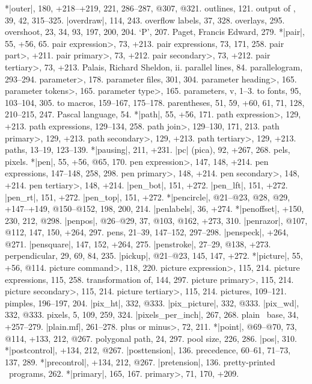 *|outer|, 180, +218--+219, 221, 286--287, @307, @321.
outlines, 121.
output of \MF, 39, 42, 315--325.
|overdraw|, 114, 243.
overflow labels, 37, 328.
overlays, 295.
overshoot, 23, 34, 93, 197, 200, 204.
\newletter
`P', 207.
Paget, Francis Edward, 279.
*|pair|, 55, +56, 65.
\<pair expression>, 73, +213.
pair expressions, 73, 171, 258.
\<pair part>, +211.
\<pair primary>, 73, +212.
\<pair secondary>, 73, +212.
\<pair tertiary>, 73, +213.
Palais, Richard Sheldon, ii.
parallel lines, 84.
parallelogram, 293--294.
\<parameter>, 178.
parameter files, 301, 304.
\<parameter heading>, 165.
\<parameter tokens>, 165.
\<parameter type>, 165.
parameters, v, 1--3.
\sub to fonts, 95, 103--104, 305.
\sub to macros, 159--167, 175--178.
parentheses, 51, 59, +60, 61, 71, 128, 210--215, 247.
Pascal language, 54.
*|path|, 55, +56, 171.
\<path expression>, 129, +213.
path expressions, 129--134, 258.
\<path join>, 129--130, 171, 213.
\<path primary>, 129, +213.
\<path secondary>, 129, +213.
\<path tertiary>, 129, +213.
paths, 13--19, 123--139.
*|pausing|, 211, +231.
|pc| (pica), 92, +267, 268.
pels, \see pixels.
*|pen|, 55, +56, @65, 170.
\<pen expression>, 147, 148, +214.
pen expressions, 147--148, 258, 298.
\<pen primary>, 148, +214.
\<pen secondary>, 148, +214.
\<pen tertiary>, 148, +214.
|pen_bot|, 151, +272.
|pen_lft|, 151, +272.
|pen_rt|, 151, +272.
|pen_top|, 151, +272.
*|pencircle|, @21--@23, @28, @29, +147--+149, @150--@152, 198, 200, 214.
|penlabels|, 36, +274.
*|penoffset|, +150, 230, 212, @298.
|penpos|, @26--@29, 37, @103, @162, +273, 310.
|penrazor|, @107, @112, 147, 150, +264, 297.
pens, 21--39, 147--152, 297--298.
|penspeck|, +264, @271.
|pensquare|, 147, 152, +264, 275.
|penstroke|, 27--29, @138, +273.
perpendicular, 29, 69, 84, 235.
|pickup|, @21--@23, 145, 147, +272.
*|picture|, 55, +56, @114.
\<picture command>, 118, 220.
\<picture expression>, 115, 214.
picture expressions, 115, 258.
\sub transformation of, 144, 297.
\<picture primary>, 115, 214.
\<picture secondary>, 115, 214.
\<picture tertiary>, 115, 214.
pictures, 109--121.
pimples, 196--197, 204.
|pix_ht|, 332, @333.
|pix_picture|, 332, @333.
|pix_wd|, 332, @333.
pixels, 5, 109, 259, 324.
|pixels_per_inch|, 267, 268.
plain \MF\ base, 34, +257--279.
|plain.mf|, 261--278.
\<plus or minus>, 72, 211.
*|point|, @69--@70, 73, @114, +133, 212, @267.
polygonal path, 24, 297.
pool size, 226, 286.
|pos|, 310.
*|postcontrol|, +134, 212, @267.
|posttension|, 136.
precedence, 60--61, 71--73, 137, 289.
*|precontrol|, +134, 212, @267.
|pretension|, 136.
pretty-printed \MF\ programs, 262.
*|primary|, 165, 167.
\<primary>, 71, 170, +209.
